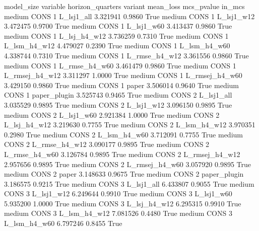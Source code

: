 model_size variable  horizon_quarters        variant  mean_loss  mcs_pvalue  in_mcs
    medium     CONS                 1     L_lsj1_all   3.321941      0.9860    True
    medium     CONS                 1     L_lsj1_w12   3.472475      0.9700    True
    medium     CONS                 1     L_lsj1_w60   3.413437      0.9860    True
    medium     CONS                 1   L_lsj_h4_w12   3.736259      0.7310    True
    medium     CONS                 1   L_lsm_h4_w12   4.479027      0.2390    True
    medium     CONS                 1   L_lsm_h4_w60   4.338744      0.7310    True
    medium     CONS                 1  L_rmse_h4_w12   3.361556      0.9860    True
    medium     CONS                 1  L_rmse_h4_w60   3.461479      0.9860    True
    medium     CONS                 1 L_rmsej_h4_w12   3.311297      1.0000    True
    medium     CONS                 1 L_rmsej_h4_w60   3.429150      0.9860    True
    medium     CONS                 1          paper   3.506014      0.9640    True
    medium     CONS                 1   paper_plugin   3.525743      0.9465    True
    medium     CONS                 2     L_lsj1_all   3.035529      0.9895    True
    medium     CONS                 2     L_lsj1_w12   3.096150      0.9895    True
    medium     CONS                 2     L_lsj1_w60   2.921384      1.0000    True
    medium     CONS                 2   L_lsj_h4_w12   3.219630      0.7755    True
    medium     CONS                 2   L_lsm_h4_w12   3.970351      0.2980    True
    medium     CONS                 2   L_lsm_h4_w60   3.712091      0.7755    True
    medium     CONS                 2  L_rmse_h4_w12   3.090177      0.9895    True
    medium     CONS                 2  L_rmse_h4_w60   3.126784      0.9895    True
    medium     CONS                 2 L_rmsej_h4_w12   2.957656      0.9895    True
    medium     CONS                 2 L_rmsej_h4_w60   3.057920      0.9895    True
    medium     CONS                 2          paper   3.148633      0.9675    True
    medium     CONS                 2   paper_plugin   3.186575      0.9215    True
    medium     CONS                 3     L_lsj1_all   6.433807      0.9055    True
    medium     CONS                 3     L_lsj1_w12   6.249644      0.9910    True
    medium     CONS                 3     L_lsj1_w60   5.935200      1.0000    True
    medium     CONS                 3   L_lsj_h4_w12   6.295315      0.9910    True
    medium     CONS                 3   L_lsm_h4_w12   7.081526      0.4480    True
    medium     CONS                 3   L_lsm_h4_w60   6.797246      0.8455    True
